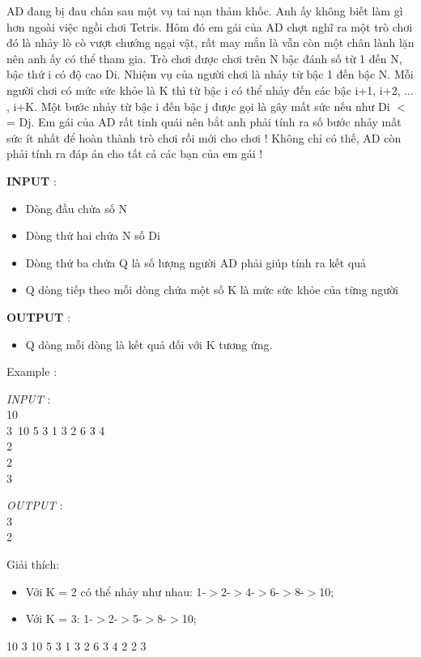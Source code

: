 



   AD đang bị đau chân sau một vụ tai nạn thảm khốc. Anh ấy không biết làm gì hơn ngoài việc ngồi chơi Tetris. Hôm đó em gái của AD chợt nghĩ ra một trò chơi đó là nhảy lò cò vượt chướng ngại vật, rất may mắn là vẫn còn một chân lành lặn nên anh ấy có thể tham gia. Trò chơi được chơi trên N bậc đánh số từ 1 đến N, bậc thứ i có độ cao Di. Nhiệm vụ của người chơi là nhảy từ bậc 1 đến bậc N. Mỗi người chơi có mức sức khỏe là K thì từ bậc i có thể nhảy đến các bậc i+1, i+2, ... , i+K. Một bước nhảy từ bậc i đến bậc j được gọi là gây mất sức nếu như Di $<$= Dj. Em gái của AD rất tinh quái nên bắt anh phải tính ra số bước nhảy mất sức ít nhất để hoàn thành trò chơi rồi mới cho chơi ! Không chỉ có thế, AD còn phải tính ra đáp án cho tất cả các bạn của em gái !  

\textbf{    INPUT   }   :  
\begin{itemize}
	\item     Dòng đầu chứa số N   
	\item     Dòng thứ hai chứa N số Di   
	\item     Dòng thứ ba chứa Q là số lượng người AD phải giúp tính ra kết quả   
	\item     Q dòng tiếp theo mỗi dòng chứa một số K là mức sức khỏe của từng người   
\end{itemize}

\textbf{    OUTPUT   }   :  
\begin{itemize}
	\item     Q dòng mỗi dòng là kết quả đối với K tương ứng.   
\end{itemize}

    Example      :  

\emph{    INPUT   }   :   
\\   10   
\\   3 10 5 3 1 3 2 6 3 4   
\\   2   
\\   2   
\\   3  

\emph{    OUTPUT   }   :   
\\   3   
\\   2  

   Giải thích:  
\begin{itemize}
	\item     Với K = 2 có thể nhảy như nhau: 1-$>$2-$>$4-$>$6-$>$8-$>$10;   
	\item     Với K = 3: 1-$>$2-$>$5-$>$8-$>$10;   
\end{itemize}     10       3 10 5 3 1 3 2 6 3 4       2       2       3    

